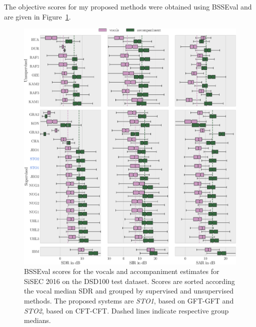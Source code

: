 The objective scores for my proposed methods were obtained using BSSEval and are given in Figure~\ref{fig:eval}.

\begin{figure}[htbp]
    \includegraphics[width=1.1\textwidth]{Chapters/06_Separation_Unknown/figures/evaluation.pdf}
    \caption{BSSEval scores for the vocals and accompaniment estimates for \acs{SiSEC} 2016 on the DSD100 test dataset. Scores are sorted according the vocal median SDR and grouped by supervised and unsupervised methods. The proposed systems are \emph{STO1}, based on GFT-GFT and \emph{STO2}, based on CFT-CFT. Dashed lines indicate respective group medians.}
    \label{fig:eval}
\end{figure}

